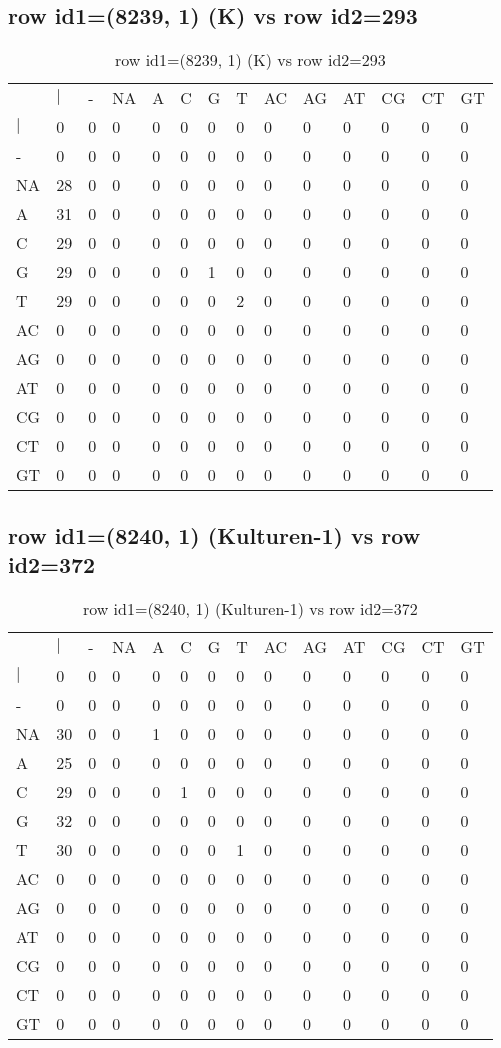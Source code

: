 \subsection{row id1=(8239, 1) (K) vs row id2=293}
\begin{center}
\begin{longtable}{|l|l|l|l|l|l|l|l|l|l|l|l|l|l|}
\caption{row id1=(8239, 1) (K) vs row id2=293} \label{table_dm368}\\
\hline
\\
\hline
&$|$&-&NA&A&C&G&T&AC&AG&AT&CG&CT&GT\\
$|$&0&0&0&0&0&0&0&0&0&0&0&0&0\\
-&0&0&0&0&0&0&0&0&0&0&0&0&0\\
NA&28&0&0&0&0&0&0&0&0&0&0&0&0\\
A&31&0&0&0&0&0&0&0&0&0&0&0&0\\
C&29&0&0&0&0&0&0&0&0&0&0&0&0\\
G&29&0&0&0&0&1&0&0&0&0&0&0&0\\
T&29&0&0&0&0&0&2&0&0&0&0&0&0\\
AC&0&0&0&0&0&0&0&0&0&0&0&0&0\\
AG&0&0&0&0&0&0&0&0&0&0&0&0&0\\
AT&0&0&0&0&0&0&0&0&0&0&0&0&0\\
CG&0&0&0&0&0&0&0&0&0&0&0&0&0\\
CT&0&0&0&0&0&0&0&0&0&0&0&0&0\\
GT&0&0&0&0&0&0&0&0&0&0&0&0&0\\
\hline
\end{longtable}
\end{center}

\subsection{row id1=(8240, 1) (Kulturen-1) vs row id2=372}
\begin{center}
\begin{longtable}{|l|l|l|l|l|l|l|l|l|l|l|l|l|l|}
\caption{row id1=(8240, 1) (Kulturen-1) vs row id2=372} \label{table_dm370}\\
\hline
\\
\hline
&$|$&-&NA&A&C&G&T&AC&AG&AT&CG&CT&GT\\
$|$&0&0&0&0&0&0&0&0&0&0&0&0&0\\
-&0&0&0&0&0&0&0&0&0&0&0&0&0\\
NA&30&0&0&1&0&0&0&0&0&0&0&0&0\\
A&25&0&0&0&0&0&0&0&0&0&0&0&0\\
C&29&0&0&0&1&0&0&0&0&0&0&0&0\\
G&32&0&0&0&0&0&0&0&0&0&0&0&0\\
T&30&0&0&0&0&0&1&0&0&0&0&0&0\\
AC&0&0&0&0&0&0&0&0&0&0&0&0&0\\
AG&0&0&0&0&0&0&0&0&0&0&0&0&0\\
AT&0&0&0&0&0&0&0&0&0&0&0&0&0\\
CG&0&0&0&0&0&0&0&0&0&0&0&0&0\\
CT&0&0&0&0&0&0&0&0&0&0&0&0&0\\
GT&0&0&0&0&0&0&0&0&0&0&0&0&0\\
\hline
\end{longtable}
\end{center}

